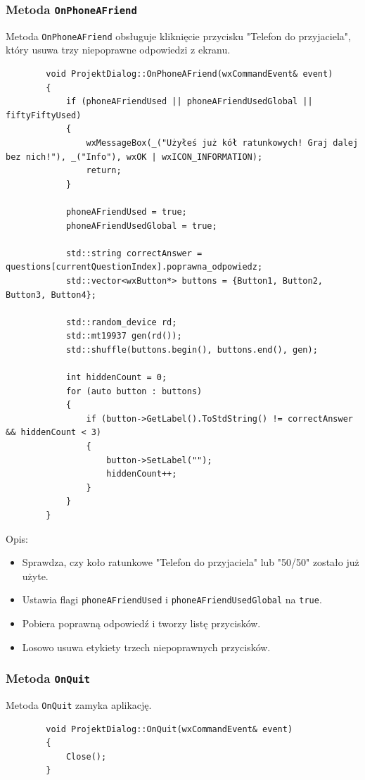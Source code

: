 \documentclass[]{article}
\begin{document}
	\subsubsection{Metoda \texttt{OnPhoneAFriend}}
	
	Metoda \texttt{OnPhoneAFriend} obsługuje kliknięcie przycisku "Telefon do przyjaciela", który usuwa trzy niepoprawne odpowiedzi z ekranu.
	
	\begin{verbatim}
		void ProjektDialog::OnPhoneAFriend(wxCommandEvent& event)
		{
			if (phoneAFriendUsed || phoneAFriendUsedGlobal || fiftyFiftyUsed)
			{
				wxMessageBox(_("Użyłeś już kół ratunkowych! Graj dalej bez nich!"), _("Info"), wxOK | wxICON_INFORMATION);
				return;
			}
			
			phoneAFriendUsed = true;
			phoneAFriendUsedGlobal = true;
			
			std::string correctAnswer = questions[currentQuestionIndex].poprawna_odpowiedz;
			std::vector<wxButton*> buttons = {Button1, Button2, Button3, Button4};
			
			std::random_device rd;
			std::mt19937 gen(rd());
			std::shuffle(buttons.begin(), buttons.end(), gen);
			
			int hiddenCount = 0;
			for (auto button : buttons)
			{
				if (button->GetLabel().ToStdString() != correctAnswer && hiddenCount < 3)
				{
					button->SetLabel("");
					hiddenCount++;
				}
			}
		}
	\end{verbatim}
	
	Opis:
	\begin{itemize}
		\item Sprawdza, czy koło ratunkowe "Telefon do przyjaciela" lub "50/50" zostało już użyte.
		\item Ustawia flagi \texttt{phoneAFriendUsed} i \texttt{phoneAFriendUsedGlobal} na \texttt{true}.
		\item Pobiera poprawną odpowiedź i tworzy listę przycisków.
		\item Losowo usuwa etykiety trzech niepoprawnych przycisków.
	\end{itemize}
	
	\subsubsection{Metoda \texttt{OnQuit}}
	
	Metoda \texttt{OnQuit} zamyka aplikację.
	
	\begin{verbatim}
		void ProjektDialog::OnQuit(wxCommandEvent& event)
		{
			Close();
		}
	\end{verbatim}
	
\end{document}
